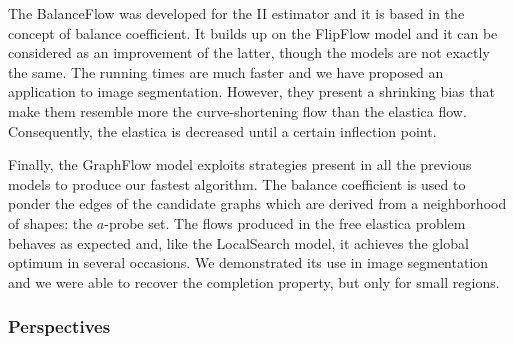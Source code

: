 The BalanceFlow was developed for the II estimator and it is based in the concept of balance coefficient. It builds up on the FlipFlow model and it can be considered as an improvement of the latter, though the models are not exactly the same. The running times are much faster and we have proposed an application to image segmentation. However, they present a shrinking bias that make them resemble more the curve-shortening flow than the elastica flow. Consequently, the elastica is decreased until a certain inflection point.

Finally, the GraphFlow model exploits strategies present in all the previous models to produce our fastest algorithm. The balance coefficient is used to ponder the edges of the candidate graphs which are derived from a neighborhood of shapes: the $a$-probe set. The flows produced in the free elastica problem behaves as expected and, like the LocalSearch model, it achieves the global optimum in several occasions. We demonstrated its use in image segmentation and we were able to recover the completion property, but only for small regions.

\subsubsection{Perspectives}

